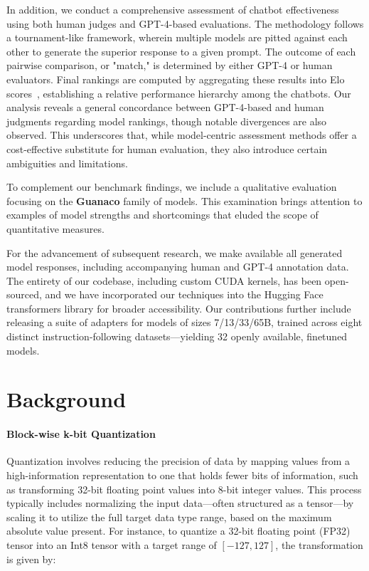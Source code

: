 In addition, we conduct a comprehensive assessment of chatbot effectiveness using both human judges and GPT-4-based evaluations. The methodology follows a tournament-like framework, wherein multiple models are pitted against each other to generate the superior response to a given prompt. The outcome of each pairwise comparison, or "match," is determined by either GPT-4 or human evaluators. Final rankings are computed by aggregating these results into Elo scores~\citep{elo1967proposed, elo1978rating}, establishing a relative performance hierarchy among the chatbots. Our analysis reveals a general concordance between GPT-4-based and human judgments regarding model rankings, though notable divergences are also observed. This underscores that, while model-centric assessment methods offer a cost-effective substitute for human evaluation, they also introduce certain ambiguities and limitations.

To complement our benchmark findings, we include a qualitative evaluation focusing on the \textbf{Guanaco} family of models. This examination brings attention to examples of model strengths and shortcomings that eluded the scope of quantitative measures.

For the advancement of subsequent research, we make available all generated model responses, including accompanying human and GPT-4 annotation data. The entirety of our codebase, including custom CUDA kernels, has been open-sourced, and we have incorporated our techniques into the Hugging Face transformers library \citep{wolf2019huggingface} for broader accessibility. Our contributions further include releasing a suite of adapters for models of sizes 7/13/33/65B, trained across eight distinct instruction-following datasets—yielding 32 openly available, finetuned models.

\section{Background}
\paragraph{Block-wise k-bit Quantization} Quantization involves reducing the precision of data by mapping values from a high-information representation to one that holds fewer bits of information, such as transforming 32-bit floating point values into 8-bit integer values. This process typically includes normalizing the input data—often structured as a tensor—by scaling it to utilize the full target data type range, based on the maximum absolute value present. For instance, to quantize a 32-bit floating point (FP32) tensor into an Int8 tensor with a target range of $[-127, 127]$, the transformation is given by:

